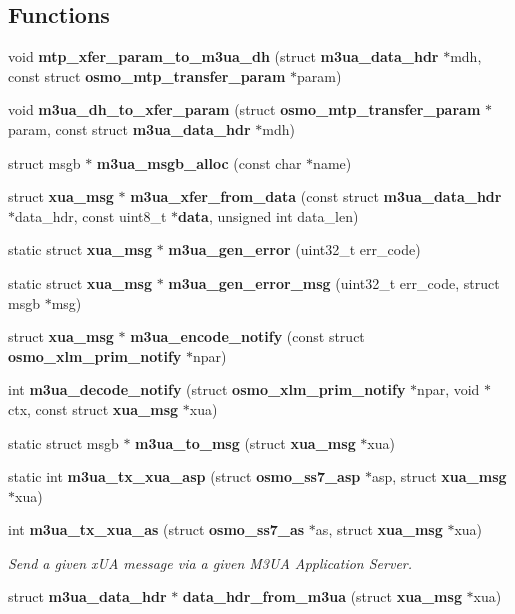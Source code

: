 \subsection*{Functions}
\begin{DoxyCompactItemize}
\item 
void {\bf mtp\+\_\+xfer\+\_\+param\+\_\+to\+\_\+m3ua\+\_\+dh} (struct {\bf m3ua\+\_\+data\+\_\+hdr} $\ast$mdh, const struct {\bf osmo\+\_\+mtp\+\_\+transfer\+\_\+param} $\ast$param)
\item 
void {\bf m3ua\+\_\+dh\+\_\+to\+\_\+xfer\+\_\+param} (struct {\bf osmo\+\_\+mtp\+\_\+transfer\+\_\+param} $\ast$param, const struct {\bf m3ua\+\_\+data\+\_\+hdr} $\ast$mdh)
\item 
struct msgb $\ast$ {\bf m3ua\+\_\+msgb\+\_\+alloc} (const char $\ast$name)
\item 
struct {\bf xua\+\_\+msg} $\ast$ {\bf m3ua\+\_\+xfer\+\_\+from\+\_\+data} (const struct {\bf m3ua\+\_\+data\+\_\+hdr} $\ast$data\+\_\+hdr, const uint8\+\_\+t $\ast${\bf data}, unsigned int data\+\_\+len)
\item 
static struct {\bf xua\+\_\+msg} $\ast$ {\bf m3ua\+\_\+gen\+\_\+error} (uint32\+\_\+t err\+\_\+code)
\item 
static struct {\bf xua\+\_\+msg} $\ast$ {\bf m3ua\+\_\+gen\+\_\+error\+\_\+msg} (uint32\+\_\+t err\+\_\+code, struct msgb $\ast$msg)
\item 
struct {\bf xua\+\_\+msg} $\ast$ {\bf m3ua\+\_\+encode\+\_\+notify} (const struct {\bf osmo\+\_\+xlm\+\_\+prim\+\_\+notify} $\ast$npar)
\item 
int {\bf m3ua\+\_\+decode\+\_\+notify} (struct {\bf osmo\+\_\+xlm\+\_\+prim\+\_\+notify} $\ast$npar, void $\ast$ctx, const struct {\bf xua\+\_\+msg} $\ast$xua)
\item 
static struct msgb $\ast$ {\bf m3ua\+\_\+to\+\_\+msg} (struct {\bf xua\+\_\+msg} $\ast$xua)
\item 
static int {\bf m3ua\+\_\+tx\+\_\+xua\+\_\+asp} (struct {\bf osmo\+\_\+ss7\+\_\+asp} $\ast$asp, struct {\bf xua\+\_\+msg} $\ast$xua)
\item 
int {\bf m3ua\+\_\+tx\+\_\+xua\+\_\+as} (struct {\bf osmo\+\_\+ss7\+\_\+as} $\ast$as, struct {\bf xua\+\_\+msg} $\ast$xua)
\begin{DoxyCompactList}\small\item\em Send a given x\+UA message via a given M3\+UA Application Server. \end{DoxyCompactList}\item 
struct {\bf m3ua\+\_\+data\+\_\+hdr} $\ast$ {\bf data\+\_\+hdr\+\_\+from\+\_\+m3ua} (struct {\bf xua\+\_\+msg} $\ast$xua)

\end{DoxyCompactItemize}
